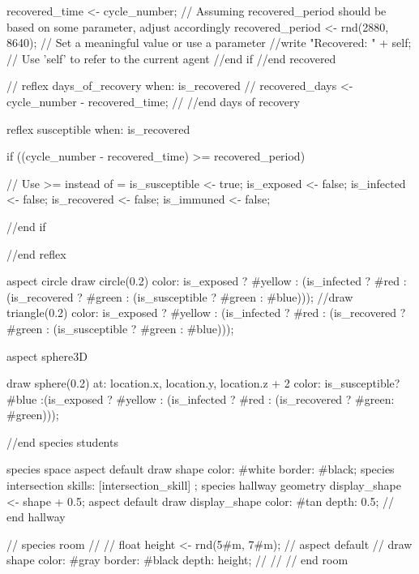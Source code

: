 \begin{verbatimtab}[4]
{{{{                     recovered_time <- cycle_number;
                    // Assuming recovered_period should be based on some parameter,
                     adjust accordingly
                    recovered_period <- rnd(2880, 8640); // Set a meaningful value or use a parameter 
                    //write "Recovered: " + self; // Use 'self' to refer to the current agent
                }//end if
            }//end recovered
                
    //		reflex days_of_recovery when: is_recovered {
    //			recovered_days <- cycle_number -  recovered_time;
    //		}//end days of recovery
                
            reflex susceptible when: is_recovered {
                if ((cycle_number - recovered_time) >= recovered_period) {  // Use >= instead of =
                    is_susceptible <- true;
                    is_exposed <- false;
                    is_infected <- false;
                    is_recovered <- false;
                    is_immuned <- false;
                    
                }//end if
            }//end reflex
        
        aspect circle {
            draw circle(0.2) color: is_exposed ? #yellow : (is_infected ? #red :
             (is_recovered ? #green : (is_susceptible ? #green : #blue)));
            //draw triangle(0.2) color: is_exposed ? #yellow : (is_infected ? #red :
             (is_recovered ? #green : (is_susceptible ? #green : #blue)));
        }	
        
            aspect sphere3D {
            draw sphere(0.2) at: {location.x, location.y, location.z + 2} color:
             is_susceptible? #blue :(is_exposed ? #yellow : (is_infected ? #red :
              (is_recovered ? #green: #green)));
        
        }
            
        }//end species students
        
        species space{
            aspect default{
                draw shape color: #white border: #black;
            }
        }
        species intersection skills: [intersection_skill] ;
        species hallway{
            geometry display_shape <- shape + 0.5;
            aspect default{
                draw display_shape color: #tan depth: 0.5;
            }
        } // end hallway
        
    //	species room{
    //
    //		float height <- rnd(5#m, 7#m);
    //		aspect default{
    //			draw shape color: #gray border: #black depth: height;
    //		}
    //	} // end room
        
}
\end{verbatimtab}
